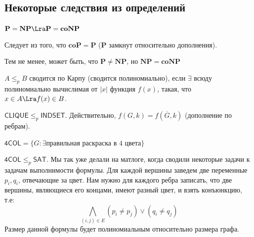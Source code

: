 \subsection{Некоторые следствия из определений}
\begin{proposition}
    \(\mathbf{P} = \mathbf{NP} \Lra \mathbf{P} = \mathbf{coNP}\)
\end{proposition}
\begin{proposition}
    Следует из того, что \(\mathbf{coP} = \mathbf{P}\) (\(\mathbf{P}\) замкнут относительно дополнения).
\end{proposition}

\begin{note}
    Тем не менее, может быть, что \(\mathbf{P} \ne \mathbf{NP}\), но \(\mathbf{NP} = \mathbf{coNP}\)
\end{note}

\begin{definition}
    \(A \le_p B\) сводится по Карпу (сводится полиномиально), если \(\exists\) всюду полиномиально вычислимая от \(|x|\) функция \(f(x)\), такая, что \(x \in A \Lra f(x) \in B\).
\end{definition}


\begin{example}
    \(\mathsf{CLIQUE} \le_p \mathsf{INDSET}\). Действительно, \(f(G, k) = f(\overline{G}, k)\) (дополнение по ребрам).
\end{example}

\begin{definition}
    \(\mathsf{4COL} = \{G: \exists \text{правильная раскраска в 4 цвета}\}\)
\end{definition}

\begin{example}
    \(\mathsf{4COL} \le_p \mathsf{SAT}\). Мы так уже делали на матлоге, когда сводили некоторые задачи к задачам выполнимости формулы. Для каждой вершины заведем две переменные \(p_i, q_i\), отвечающие за цвет. Нам нужно для каждого ребра записать, что две вершины, являющиеся его концами, имеют разный цвет, и взять конъюнкцию, т.е:
    \[\bigwedge_{(i, j) \in E} (p_i \ne p_j) \vee (q_i \ne q_j)\]
    Размер данной формулы будет полиномиальным относительно размера графа.
\end{example}

